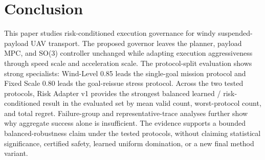 \section{Conclusion}

This paper studies risk-conditioned execution governance for windy
suspended-payload UAV transport. The proposed governor leaves the planner,
payload MPC, and SO(3) controller unchanged while adapting execution
aggressiveness through speed scale and acceleration scale. The protocol-split
evaluation shows strong
specialists: Wind-Level 0.85 leads the single-goal mission protocol
and Fixed Scale 0.80 leads the goal-reissue stress protocol. Across the
two tested protocols, Risk Adapter v1 provides the strongest
balanced learned / risk-conditioned result in the evaluated set by mean valid
count, worst-protocol count, and total regret. Failure-group and
representative-trace analyses further show why aggregate success alone is
insufficient. The evidence supports a bounded balanced-robustness claim under
the tested protocols, without claiming statistical significance, certified
safety, learned uniform domination, or a new final method variant.

